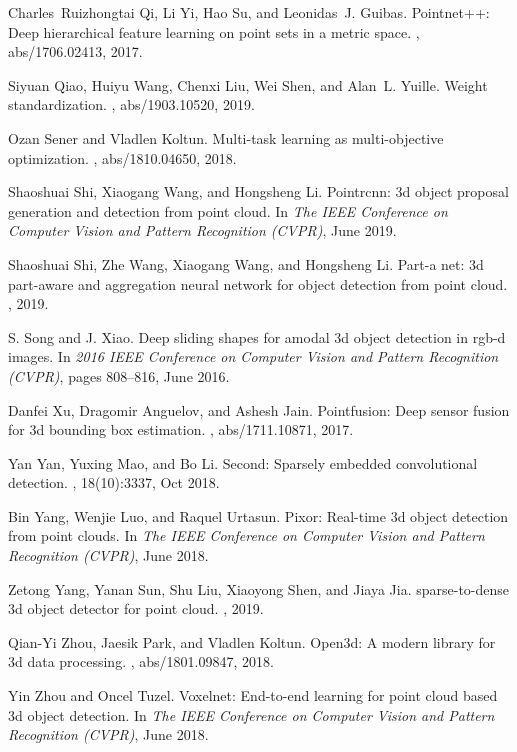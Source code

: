 \documentclass[10pt,twocolumn,letterpaper]{article}
\begin{document}
{\begin{thebibliography}{10}
Charles~Ruizhongtai Qi, Li Yi, Hao Su, and Leonidas~J. Guibas.
\newblock Pointnet++: Deep hierarchical feature learning on point sets in a
  metric space.
, abs/1706.02413, 2017.

Siyuan Qiao, Huiyu Wang, Chenxi Liu, Wei Shen, and Alan~L. Yuille.
\newblock Weight standardization.
, abs/1903.10520, 2019.

Ozan Sener and Vladlen Koltun.
\newblock Multi-task learning as multi-objective optimization.
, abs/1810.04650, 2018.

Shaoshuai Shi, Xiaogang Wang, and Hongsheng Li.
\newblock Pointrcnn: 3d object proposal generation and detection from point
  cloud.
\newblock In {\em The IEEE Conference on Computer Vision and Pattern
  Recognition (CVPR)}, June 2019.

Shaoshuai Shi, Zhe Wang, Xiaogang Wang, and Hongsheng Li.
\newblock Part-a net: 3d part-aware and aggregation neural network for
  object detection from point cloud.
, 2019.

S. {Song} and J. {Xiao}.
\newblock Deep sliding shapes for amodal 3d object detection in rgb-d images.
\newblock In {\em 2016 IEEE Conference on Computer Vision and Pattern
  Recognition (CVPR)}, pages 808--816, June 2016.

Danfei Xu, Dragomir Anguelov, and Ashesh Jain.
\newblock Pointfusion: Deep sensor fusion for 3d bounding box estimation.
, abs/1711.10871, 2017.

Yan Yan, Yuxing Mao, and Bo Li.
\newblock Second: Sparsely embedded convolutional detection.
, 18(10):3337, Oct 2018.

Bin Yang, Wenjie Luo, and Raquel Urtasun.
\newblock Pixor: Real-time 3d object detection from point clouds.
\newblock In {\em The IEEE Conference on Computer Vision and Pattern
  Recognition (CVPR)}, June 2018.

Zetong Yang, Yanan Sun, Shu Liu, Xiaoyong Shen, and Jiaya Jia.
 sparse-to-dense 3d object detector for point cloud.
, 2019.

Qian{-}Yi Zhou, Jaesik Park, and Vladlen Koltun.
\newblock Open3d: {A} modern library for 3d data processing.
, abs/1801.09847, 2018.

Yin Zhou and Oncel Tuzel.
\newblock Voxelnet: End-to-end learning for point cloud based 3d object
  detection.
\newblock In {\em The IEEE Conference on Computer Vision and Pattern
  Recognition (CVPR)}, June 2018.

\end{thebibliography}
 }
\end{document}
